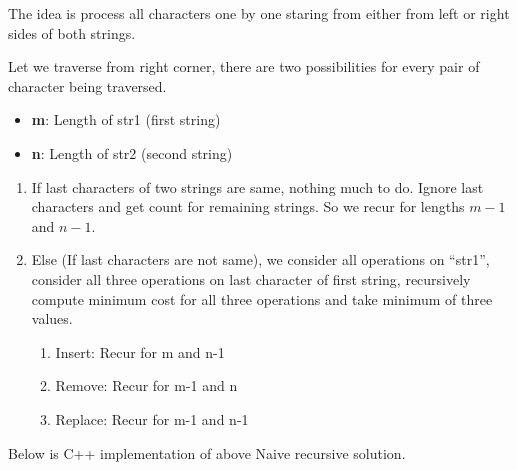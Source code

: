 \RayNotesEnd

\textbf{}


The idea is process all characters one by one staring from either from left
or right sides of both strings.

Let we traverse from right corner, there are two possibilities for every
pair of character being traversed.
\begin{itemize}%
\item \textbf{m}: Length of str1 (first string)
\item \textbf{n}: Length of str2 (second string)
\end{itemize}
\begin{enumerate}[label=\textbf{\arabic*.}]
\item If last characters of two strings are same, nothing much to do. Ignore
  last characters and get count for remaining strings. So we recur for
  lengths $m-1$ and $n-1$.
\item Else (If last characters are not same), we consider all operations on
  ``str1'', consider all three operations on last character of first string,
  recursively compute minimum cost for all three operations and take minimum
  of three values.
  \begin{enumerate}[label=\textbf{\alph*.}]
  \item Insert: Recur for m and n-1
  \item Remove: Recur for m-1 and n
  \item Replace: Recur for m-1 and n-1
  \end{enumerate}
\end{enumerate}
Below is C++ implementation of above Naive recursive solution.

